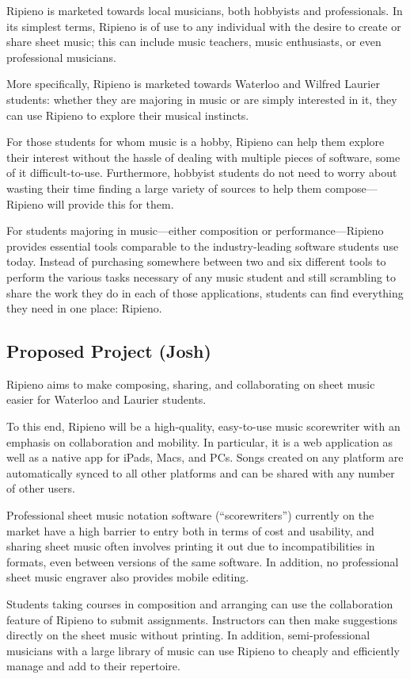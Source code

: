 \documentclass[12pt]{article}
\begin{document}
Ripieno is marketed towards local musicians, both hobbyists and professionals. In its simplest terms, Ripieno is of use to any individual with the desire to create or share sheet music; this can include music teachers, music enthusiasts, or even professional musicians.

More specifically, Ripieno is marketed towards Waterloo and Wilfred Laurier students: whether they are majoring in music or are simply interested in it, they can use Ripieno to explore their musical instincts.

For those students for whom music is a hobby, Ripieno can help them explore their interest without the hassle of dealing with multiple pieces of software, some of it difficult-to-use. Furthermore, hobbyist students do not need to worry about wasting their time finding a large variety of sources to help them compose---Ripieno will provide this for them.

For students majoring in music---either composition or performance---Ripieno provides essential tools comparable to the industry-leading software students use today. Instead of purchasing somewhere between two and six different tools to perform the various tasks necessary of any music student and still scrambling to share the work they do in each of those applications, students can find everything they need in one place: Ripieno.

\subsection{Proposed Project (Josh)}
Ripieno aims to make composing, sharing, and collaborating on sheet music easier for Waterloo and Laurier students.

To this end, Ripieno will be a high-quality, easy-to-use music scorewriter with an emphasis on collaboration and mobility. In particular, it is a web application as well as a native app for iPads, Macs, and PCs. Songs created on any platform are automatically synced to all other platforms and can be shared with any number of other users.

Professional sheet music notation software (``scorewriters'') currently on the market have a high barrier to entry both in terms of cost and usability, and sharing sheet music often involves printing it out due to incompatibilities in formats, even between versions of the same software. In addition, no professional sheet music engraver also provides mobile editing.

Students taking courses in composition and arranging can use the collaboration feature of Ripieno to submit assignments. Instructors can then make suggestions directly on the sheet music without printing. In addition, semi-professional musicians with a large library of music can use Ripieno to cheaply and efficiently manage and add to their repertoire.
\end{document}
